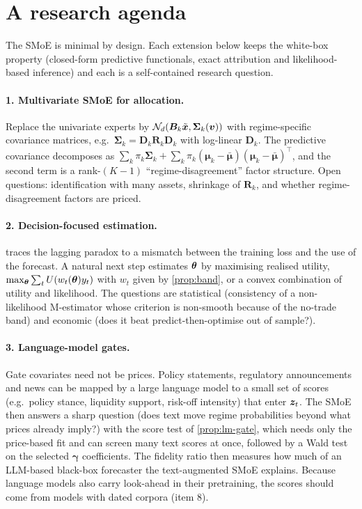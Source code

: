 \section{A research agenda}\label{sec:agenda}

The SMoE is minimal by design. Each extension below keeps the white-box property (closed-form
predictive functionals, exact attribution and likelihood-based inference) and each is a
self-contained research question.

\paragraph{1. Multivariate SMoE for allocation.}
Replace the univariate experts by $\mathcal{N}_d(\bm B_k\tilde{\bm{x}},\bm\Sigma_k(\bm{v}))$ with regime-specific
covariance matrices, e.g.\ $\bm\Sigma_k=\bm D_k\bm R_k\bm D_k$ with log-linear $\bm D_k$. The
predictive covariance decomposes as $\sum_k\pi_k\bm\Sigma_k+\sum_k\pi_k(\bm\mu_k-\bar{\bm\mu})(\bm\mu_k-\bar{\bm\mu})^\top$,
and the second term is a rank-$(K-1)$ ``regime-disagreement'' factor structure. Open questions:
identification with many assets, shrinkage of $\bm R_k$, and whether regime-disagreement factors are
priced.

\paragraph{2. Decision-focused estimation.}
 traces the lagging paradox to a mismatch between the training loss and the use of the
forecast. A natural next step estimates $\bm{\theta}$ by maximising realised utility,
$\max_{\bm{\theta}}\sum_tU(w_t(\bm{\theta})y_t)$ with $w_t$ given by \cref{prop:band}, or a convex combination of
utility and likelihood. The questions are statistical (consistency of a non-likelihood M-estimator
whose criterion is non-smooth because of the no-trade band) and economic (does it beat
predict-then-optimise out of sample?).

\paragraph{3. Language-model gates.}
Gate covariates need not be prices. Policy statements, regulatory announcements and news can be
mapped by a large language model to a small set of scores (e.g.\ policy stance, liquidity support,
risk-off intensity) that enter $\bm{z}_t$. The SMoE then answers a sharp question (does text move
regime probabilities beyond what prices already imply?) with the score test of \cref{prop:lm-gate},
which needs only the price-based fit and can screen many text scores at once, followed by a Wald test
on the selected $\bm\gamma$ coefficients. The fidelity ratio then measures how much of an LLM-based
black-box forecaster the text-augmented SMoE explains. Because language models also carry look-ahead
in their pretraining, the scores should come from models with dated corpora (item 8).

